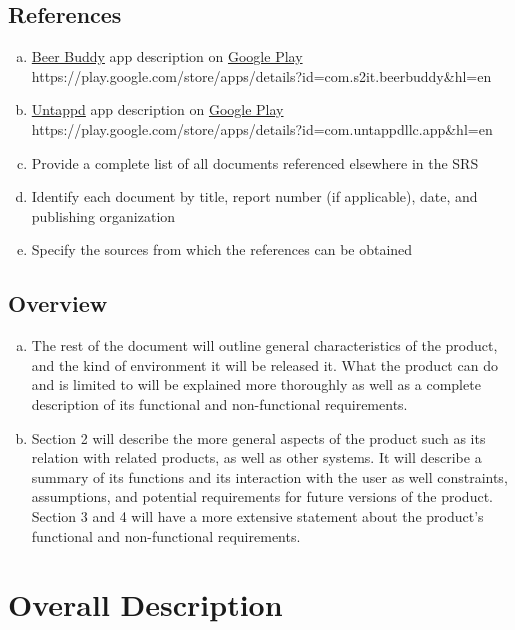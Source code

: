 \documentclass[]{article}
\begin{document}
\subsection{{References}}
\label{sub:references}
\begin{enumerate}[a)]
	\item \underline{Beer Buddy} app description on \underline{Google Play}  \\
https://play.google.com/store/apps/details?id=com.s2it.beerbuddy\&hl=en
	\item \underline{Untappd} app description on \underline{Google Play} \\
https://play.google.com/store/apps/details?id=com.untappdllc.app\&hl=en
	\\
	\item Provide a complete list of all documents referenced elsewhere in the SRS
	\item Identify each document by title, report number (if applicable), date, and publishing organization
	\item Specify the sources from which the references can be obtained
\end{enumerate}

\subsection{{Overview}}
\label{sub:overview}
\begin{enumerate}[a)]
	\item  The rest of the document will outline general characteristics of the product, and the kind of environment it will be released it. What the product can do and is limited to will be explained more thoroughly as well as a complete description of its functional and non-functional requirements.
	\item Section 2 will describe the more general aspects of the product such as its relation with related products, as well as other systems. It will describe a summary of its functions and its interaction with the user as well constraints, assumptions, and potential requirements for future versions of the product. Section 3 and 4 will have a more extensive statement about the product's functional and non-functional requirements.
\end{enumerate}


\section{Overall Description}
\label{sec:overall_description}
\end{document}
